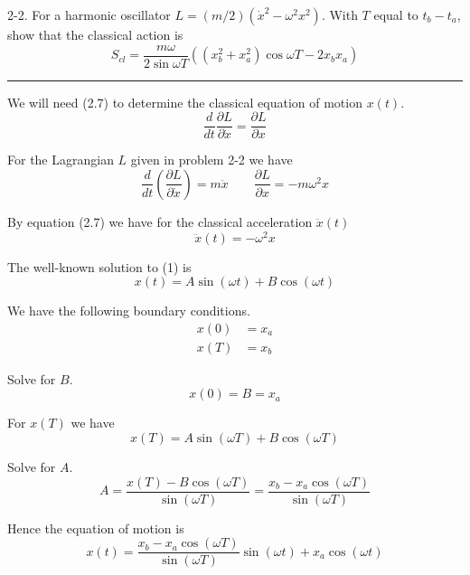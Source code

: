 \documentclass[12pt]{article}
\begin{document}
2-2.
For a harmonic oscillator $L=(m/2)(\dot x^2-\omega^2x^2)$.
With $T$ equal to $t_b-t_a$, show that the classical action is
\begin{equation*}
S_{cl}=\frac{m\omega}{2\sin\omega T}
\left(\left(x_b^2+x_a^2\right)\cos\omega T-2x_bx_a\right)
\tag{2.9}
\end{equation*}

\bigskip
\hrule

\bigskip
We will need (2.7) to determine the classical equation of motion $x(t)$.
\begin{equation*}
\frac{d}{dt}\frac{\partial L}{\partial\dot x}=\frac{\partial L}{\partial x}
\tag{2.7}
\end{equation*}

For the Lagrangian $L$ given in problem 2-2 we have
\begin{equation*}
\frac{d}{dt}\left(\frac{\partial L}{\partial\dot x}\right)=m\ddot x
\qquad
\frac{\partial L}{\partial x}=-m\omega^2x
\end{equation*}

By equation (2.7) we have for the classical acceleration $\ddot x(t)$
\begin{equation*}
\ddot x(t)=-\omega^2x
\tag{1}
\end{equation*}

The well-known solution to (1) is
\begin{equation*}
x(t)=A\sin(\omega t)+B\cos(\omega t)
\end{equation*}

We have the following boundary conditions.
\begin{align*}
x(0)&=x_a
\\[1ex]
x(T)&=x_b
\end{align*}

Solve for $B$.
\begin{equation*}
x(0)=B=x_a
\end{equation*}

For $x(T)$ we have
\begin{equation*}
x(T)=A\sin(\omega T)+B\cos(\omega T)
\end{equation*}

Solve for $A$.
\begin{equation*}
A=\frac{x(T)-B\cos(\omega T)}{\sin(\omega T)}=
\frac{x_b-x_a\cos(\omega T)}{\sin(\omega T)}
\end{equation*}

Hence the equation of motion is
\begin{equation*}
x(t)=\frac{x_b-x_a\cos(\omega T)}{\sin(\omega T)}\sin(\omega t)+x_a\cos(\omega t)
\tag{2}
\end{equation*}
\end{document}
